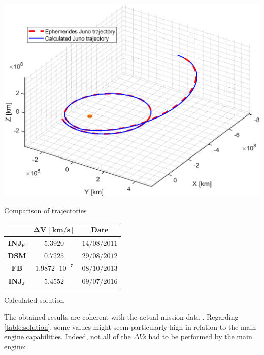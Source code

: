 \vspace{5pt}
\begin{minipage}{0.5\linewidth}
    \centering
    \captionsetup{type=figure}
    \includegraphics[width=\linewidth]{Images/trajectory.eps}
    \caption{Comparison of trajectories}
    \label{fig:trajectory}
\end{minipage}\hfill
\begin{minipage}{0.5\linewidth}
    \centering
    \captionsetup{type=table}
    \renewcommand{\arraystretch}{1.5}
    \setlength\extrarowheight{-1pt}
    \begin{tabular}{|c|c|c|}
        \hline
        & $\boldsymbol{\Delta V \, [km/s]}$ & $\boldsymbol{Date}$ \\
        \hline
        $\boldsymbol{INJ_E}$ & $5.3920$ & $14/08/2011$ \\
        \hline
        $\boldsymbol{DSM}$ & $0.7225$ & $29/08/2012$ \\
        \hline
        $\boldsymbol{FB}$ & $1.9872 \cdot 10^{-7}$ & $08/10/2013$ \\
        \hline
        $\boldsymbol{INJ_J}$ & $5.4552$ & $09/07/2016$ \\
        \hline
    \end{tabular}
    \caption{Calculated solution}
    \label{table:solution}
\end{minipage} 
The obtained results are coherent with the actual mission data \cite{juno_navigation}. Regarding \autoref{table:solution}, some values might seem particularly high in relation to the main engine capabilities. 
Indeed, not all of the $\Delta V$s had to be performed by the main engine:
